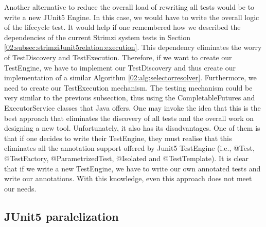 Another alternative to reduce the overall load of rewriting all tests would be to write a new JUnit5 Engine. In this case, we would have to write the overall logic of the lifecycle test. It would help if one remembered how we described the dependencies of the current Strimzi system tests in Section \ref{02:subsec:strimziJunit5relation:execution}. This dependency eliminates the worry of TestDiscovery and TestExecution. Therefore, if we want to create our TestEngine, we have to implement our TestDiscovery and thus create our implementation of a similar Algorithm \ref{02:alg:selectorresolver}. Furthermore, we need to create our TestExecution mechanism. The testing mechanism could be very similar to the previous subsection, thus using the CompletableFutures and ExecutorService classes that Java offers. One may invoke the idea that this is the best approach that eliminates the discovery of all tests and the overall work on designing a new tool. Unfortunately, it also has its disadvantages. One of them is that if one decides to write their TestEngine, they must realise that this eliminates all the annotation support offered by Junit5 TestEngine (i.e., @Test, @TestFactory, @ParametrizedTest, @Isolated and @TestTemplate). It is clear that if we write a new TestEngine, we have to write our own annotated tests and write our annotations. With this knowledge, even this approach does not meet our needs.


\subsection{JUnit5 paralelization}

